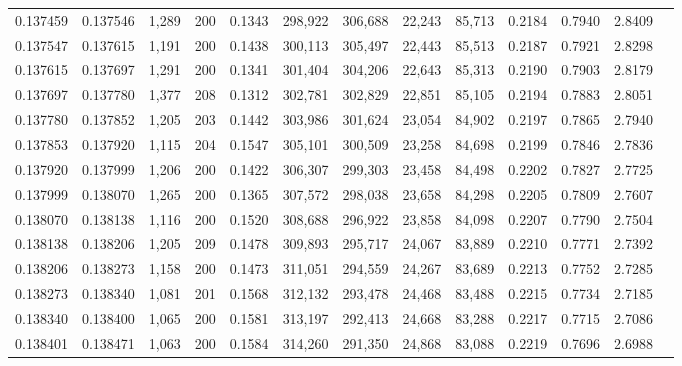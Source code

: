 \begin{tabular}{rrrrrrrrrrrrr}
0.137459 & 0.137546 &  1,289 & 200 &                                     0.1343 & 298,922 & 306,688 &  22,243 &  85,713 & 0.2184 & 0.7940 & 2.8409 \\
0.137547 & 0.137615 &  1,191 & 200 &                                     0.1438 & 300,113 & 305,497 &  22,443 &  85,513 & 0.2187 & 0.7921 & 2.8298 \\
0.137615 & 0.137697 &  1,291 & 200 &                                     0.1341 & 301,404 & 304,206 &  22,643 &  85,313 & 0.2190 & 0.7903 & 2.8179 \\
0.137697 & 0.137780 &  1,377 & 208 &                                     0.1312 & 302,781 & 302,829 &  22,851 &  85,105 & 0.2194 & 0.7883 & 2.8051 \\
0.137780 & 0.137852 &  1,205 & 203 &                                     0.1442 & 303,986 & 301,624 &  23,054 &  84,902 & 0.2197 & 0.7865 & 2.7940 \\
0.137853 & 0.137920 &  1,115 & 204 &                                     0.1547 & 305,101 & 300,509 &  23,258 &  84,698 & 0.2199 & 0.7846 & 2.7836 \\
0.137920 & 0.137999 &  1,206 & 200 &                                     0.1422 & 306,307 & 299,303 &  23,458 &  84,498 & 0.2202 & 0.7827 & 2.7725 \\
0.137999 & 0.138070 &  1,265 & 200 &                                     0.1365 & 307,572 & 298,038 &  23,658 &  84,298 & 0.2205 & 0.7809 & 2.7607 \\
0.138070 & 0.138138 &  1,116 & 200 &                                     0.1520 & 308,688 & 296,922 &  23,858 &  84,098 & 0.2207 & 0.7790 & 2.7504 \\
0.138138 & 0.138206 &  1,205 & 209 &                                     0.1478 & 309,893 & 295,717 &  24,067 &  83,889 & 0.2210 & 0.7771 & 2.7392 \\
0.138206 & 0.138273 &  1,158 & 200 &                                     0.1473 & 311,051 & 294,559 &  24,267 &  83,689 & 0.2213 & 0.7752 & 2.7285 \\
0.138273 & 0.138340 &  1,081 & 201 &                                     0.1568 & 312,132 & 293,478 &  24,468 &  83,488 & 0.2215 & 0.7734 & 2.7185 \\
0.138340 & 0.138400 &  1,065 & 200 &                                     0.1581 & 313,197 & 292,413 &  24,668 &  83,288 & 0.2217 & 0.7715 & 2.7086 \\
0.138401 & 0.138471 &  1,063 & 200 &                                     0.1584 & 314,260 & 291,350 &  24,868 &  83,088 & 0.2219 & 0.7696 & 2.6988 \\

\end{tabular}

